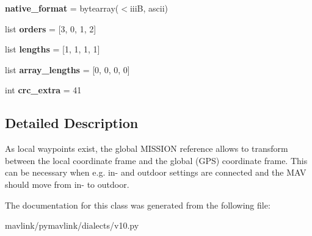 \begin{DoxyCompactItemize}
\item 
\mbox{\label{classpymavlink_1_1dialects_1_1v10_1_1MAVLink__set__gps__global__origin__message_abe88a9c84f938f5099fbe47fe19f2e21}} 
{\bfseries native\+\_\+format} = bytearray(\textquotesingle{}$<$iiiB\textquotesingle{}, \textquotesingle{}ascii\textquotesingle{})
\item 
\mbox{\label{classpymavlink_1_1dialects_1_1v10_1_1MAVLink__set__gps__global__origin__message_a7586b548c8a848b6504b13eb2866cc6e}} 
list {\bfseries orders} = \mbox{[}3, 0, 1, 2\mbox{]}
\item 
\mbox{\label{classpymavlink_1_1dialects_1_1v10_1_1MAVLink__set__gps__global__origin__message_a58a702528aae04f61f5efd8e63f451b1}} 
list {\bfseries lengths} = \mbox{[}1, 1, 1, 1\mbox{]}
\item 
\mbox{\label{classpymavlink_1_1dialects_1_1v10_1_1MAVLink__set__gps__global__origin__message_a12e9fc3d6709324150739a8ac26fdb9a}} 
list {\bfseries array\+\_\+lengths} = \mbox{[}0, 0, 0, 0\mbox{]}
\item 
\mbox{\label{classpymavlink_1_1dialects_1_1v10_1_1MAVLink__set__gps__global__origin__message_a2d447ee21f61ba626d79f01877c66d85}} 
int {\bfseries crc\+\_\+extra} = 41
\end{DoxyCompactItemize}


\subsection{Detailed Description}
\begin{DoxyVerb}As local waypoints exist, the global MISSION reference allows
to transform between the local coordinate frame and the global
(GPS) coordinate frame. This can be necessary when e.g. in-
and outdoor settings are connected and the MAV should move
from in- to outdoor.
\end{DoxyVerb}
 

The documentation for this class was generated from the following file\+:\begin{DoxyCompactItemize}
\item 
mavlink/pymavlink/dialects/v10.\+py\end{DoxyCompactItemize}

